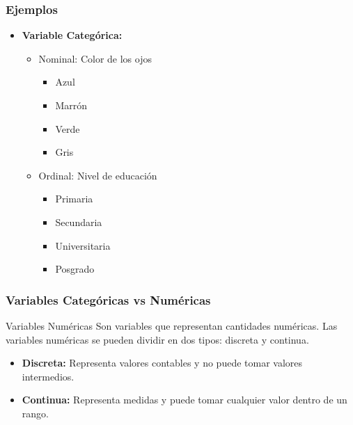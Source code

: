\documentclass[aspectratio=169,12pt]{beamer}
\begin{document}
\begin{frame}
\frametitle{Ejemplos}
\begin{itemize}
    \item \textbf{Variable Categórica:}
    \begin{itemize}
        \item Nominal: Color de los ojos
        \begin{itemize}
            \item Azul
            \item Marrón
            \item Verde
            \item Gris
        \end{itemize}
        \item Ordinal: Nivel de educación
        \begin{itemize}
            \item Primaria
            \item Secundaria
            \item Universitaria
            \item Posgrado
        \end{itemize}
    \end{itemize}
\end{itemize}

\end{frame}


\begin{frame}
\frametitle{Variables Categóricas vs Numéricas}
\begin{block}{Variables Numéricas}
Son variables que representan cantidades numéricas.
Las variables numéricas se pueden dividir en dos tipos: discreta y continua.
\begin{itemize}
    \item \textbf{Discreta:} Representa valores contables y no puede tomar valores intermedios.
    \item \textbf{Continua:} Representa medidas y puede tomar cualquier valor dentro de un rango.
\end{itemize}
\end{block}

\end{frame}

%
%
%
%
\end{document}
